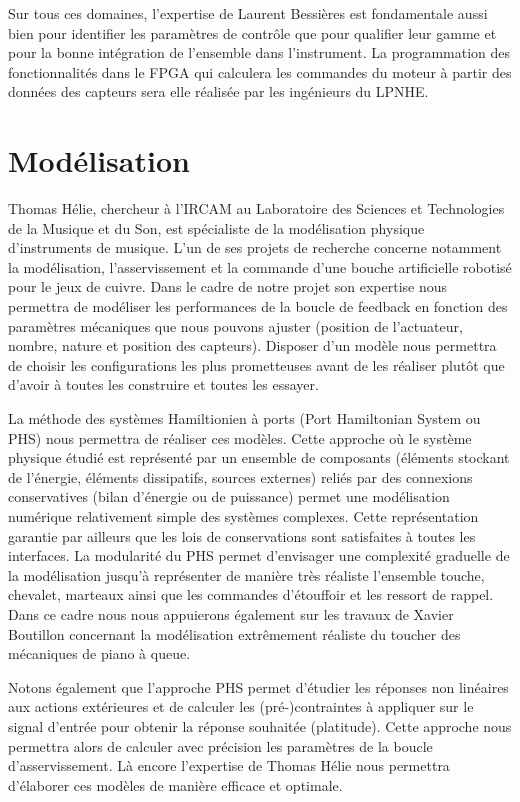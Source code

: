 \documentclass[french,a4paper,12pt]{report}
\begin{document}
Sur tous ces domaines, l’expertise de Laurent Bessières est fondamentale aussi bien pour identifier les paramètres de contrôle que pour qualifier leur gamme et pour la bonne intégration de l’ensemble dans l’instrument. La programmation des fonctionnalités dans le FPGA qui calculera les commandes du moteur à partir des données des capteurs sera elle réalisée par les ingénieurs du LPNHE.

  \section{Modélisation}

Thomas Hélie, chercheur à l’IRCAM au Laboratoire des Sciences et Technologies de la Musique et du Son, est spécialiste de la modélisation physique d’instruments de musique. L’un de ses projets de recherche concerne notamment la modélisation, l’asservissement et la commande d’une bouche artificielle robotisé pour le jeux de cuivre. Dans le cadre de notre projet son expertise nous permettra de modéliser les performances de la boucle de feedback en fonction des paramètres mécaniques que nous pouvons ajuster (position de l’actuateur, nombre, nature et position des capteurs). Disposer d’un modèle nous permettra de choisir les configurations les plus prometteuses avant de les réaliser plutôt que d’avoir à toutes les construire et toutes les essayer.

La méthode des systèmes Hamiltionien à ports (Port Hamiltonian System ou PHS) nous permettra de réaliser ces modèles. Cette approche où le système physique étudié est représenté par un ensemble de composants (éléments stockant de l’énergie, éléments dissipatifs, sources externes) reliés par des connexions conservatives (bilan d’énergie ou de puissance) permet une modélisation numérique relativement simple des systèmes complexes. Cette représentation garantie par ailleurs que les lois de conservations sont satisfaites à toutes les interfaces. La modularité du PHS permet d’envisager une complexité graduelle de la modélisation jusqu’à représenter de manière très réaliste l’ensemble touche, chevalet, marteaux ainsi que les commandes d’étouffoir et les ressort de rappel. Dans ce cadre nous nous appuierons également sur les travaux de Xavier Boutillon concernant la modélisation extrêmement réaliste du toucher des mécaniques de piano à queue.

Notons également que l’approche PHS permet d’étudier les réponses non linéaires aux actions extérieures et de calculer les (pré-)contraintes à appliquer sur le signal d’entrée pour obtenir la réponse souhaitée (platitude). Cette approche nous permettra alors de calculer avec précision les paramètres de la boucle d’asservissement. Là encore l’expertise de Thomas Hélie nous permettra d’élaborer ces modèles de manière efficace et optimale.
\end{document}

